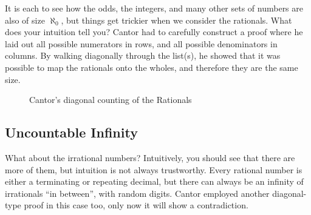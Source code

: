 It is each to see how the odds, the integers, and many other sets of numbers are also
of size $\aleph_0$, but things get trickier when we consider the rationals.  What does
your intuition tell you?  Cantor had to carefully construct a proof where he laid out 
all possible numerators in rows, and all possible denominators in columns.  By walking
diagonally through the list(s), he showed that it was possible to map the rationals
onto the wholes, and therefore they are the same size.

\begin{figure}[h]
\begin{centering}
\caption{Cantor's diagonal counting of the Rationals}
\end{centering}
\end{figure}

\subsection{Uncountable Infinity}
What about the irrational numbers?  Intuitively, you should see that there are more of
them, but intuition is not always trustworthy.  Every rational number is either a 
terminating or repeating decimal, but there can always be an infinity of irrationals
``in between'', with random digits.  Cantor employed another diagonal-type proof
in this case too, only now it will show a contradiction.


